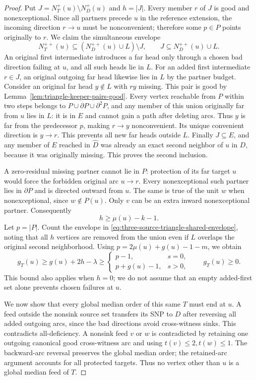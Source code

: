 \begin{proof}
Put $J=N_T^+(u)\setminus N_D^+(u)$ and $h=|J|$.
Every member $r$ of $J$ is good and nonexceptional.  Since all
partners precede $u$ in the reference extension, the incoming
direction $r\to u$ must be nonconvenient; therefore some
$p\in P$ points originally to $r$.
We claim the simultaneous envelope
\[
 N_T^{++}(u)\subseteq (N_D^{++}(u)\cup L)\setminus J,
 \qquad J\subseteq N_D^{++}(u)\cup L.
 \tag{T21}\label{eq:three-source-triangle-shared-envelope}
\]
An original first intermediate introduces a far head only through
a chosen bad direction failing at $u$, and all such heads lie in $L$.
For an added first intermediate $r\in J$, an original outgoing
far head likewise lies in $L$ by the partner budget.  Consider an
original far head $y\notin L$ with $ry$ missing.  This pair is good
by Lemma~\ref{lem:triangle-keeper-pairs-good}.
Every vertex reachable from $P$ within two steps belongs to
$P\cup\partial P\cup\partial^2P$, and any member of this union
originally far from $u$ lies in $L$: it is in $E$ and cannot gain
a path after deleting arcs.  Thus $y$ is far from the predecessor
$p$, making $r\to y$ nonconvenient.  Its unique convenient direction
is $y\to r$.  This prevents all new far heads outside $L$.
Finally $J\subseteq E$, and any member of $E$ reached in
$\widehat D$ was already an exact second neighbor of $u$ in $D$,
because it was originally missing.  This proves the second inclusion.

A zero-residual missing partner cannot lie in $P$: protection of
its far target $u$ would force the forbidden original arc $u\to r$.
Every nonexceptional such partner lies in $\partial P$ and is
directed outward from $u$.  The same is true of the unit $w$ when
nonexceptional, since $w\notin P(u)$.  Only $v$ can be an extra
inward nonexceptional partner.  Consequently
\[
 h\ge\mu(u)-k-1.
\]
Let $p=|P|$.  Count the envelope in
\eqref{eq:three-source-triangle-shared-envelope}, noting that all
$h$ vertices are removed from the union even if $L$ overlaps the
original second neighborhood.  Using
$p=2\mu(u)+g(u)-1-m$, we obtain
\[
 g_T(u)\ge g(u)+2h-\lambda\ge
 \begin{cases}p-1,&s=0,\\p+g(u)-1,&s>0,\end{cases}
 \qquad g_T(u)\ge0.
 \tag{T22}\label{eq:three-source-triangle-nonnegative}
\]
This bound also applies when $h=0$; we do not assume that an empty
added-first set alone prevents chosen failures at $u$.

We now show that every global median order of this same $T$ must
end at $u$.  A feed outside the nonsink source set transfers its
SNP to $D$ after reversing all added outgoing arcs, since the bad
directions avoid cross-witness sinks.  This contradicts all-deficiency.
A nonsink feed $v$ or $w$ is contradicted by retaining one outgoing
canonical good cross-witness arc and using $t(v)\le2,t(w)\le1$.
The backward-arc reversal preserves the global median order; the
retained-arc argument accounts for all protected targets.  Thus no
vertex other than $u$ is a global median feed of $T$.


\end{proof}
